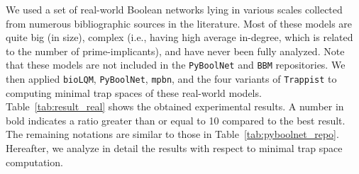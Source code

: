 \documentclass[preprint,12pt]{elsarticle}
\begin{document}
We used a set of real-world Boolean networks lying in various scales collected from numerous bibliographic sources in the literature.
Most of these models are quite big (in size), complex (i.e., having high average in-degree, which is related to the number of prime-implicants), and have never been fully analyzed.
Note that these models are not included in the \texttt{PyBoolNet} and \texttt{BBM} repositories.
We then applied \texttt{bioLQM}, \texttt{PyBoolNet}, \texttt{mpbn}, and the four variants of \texttt{Trappist} to computing minimal trap spaces of these real-world models.
Table~\ref{tab:result_real} shows the obtained experimental results.
A number in bold indicates a ratio greater than or equal to 10 compared to the best result.
The remaining notations are similar to those in Table~\ref{tab:pyboolnet_repo}.
Hereafter, we analyze in detail the results with respect to minimal trap space computation.
\end{document}
